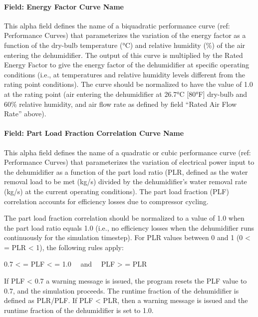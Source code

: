 \paragraph{Field: Energy Factor Curve Name}\label{field-energy-factor-curve-name}

This alpha field defines the name of a biquadratic performance curve (ref: Performance Curves) that parameterizes the variation of the energy factor as a function of the dry-bulb temperature (°\si{C}) and relative humidity (\%) of the air entering the dehumidifier. The output of this curve is multiplied by the Rated Energy Factor to give the energy factor of the dehumidifier at specific operating conditions (i.e., at temperatures and relative humidity levels different from the rating point conditions). The curve should be normalized to have the value of 1.0 at the rating point (air entering the dehumidifier at 26.7°\si{C} {[}80°F{]} dry-bulb and 60\% relative humidity, and air flow rate as defined by field ``Rated Air Flow Rate'' above).

\paragraph{Field: Part Load Fraction Correlation Curve Name}\label{field-part-load-fraction-correlation-curve-name-000}

This alpha field defines the name of a quadratic or cubic performance curve (ref: Performance Curves) that parameterizes the variation of electrical power input to the dehumidifier as a function of the part load ratio (PLR, defined as the water removal load to be met (kg/s) divided by the dehumidifier's water removal rate (kg/s) at the current operating conditions). The part load fraction (PLF) correlation accounts for efficiency losses due to compressor cycling.

The part load fraction correlation should be normalized to a value of 1.0 when the part load ratio equals 1.0 (i.e., no efficiency losses when the dehumidifier runs continuously for the simulation timestep). For PLR values between 0 and 1 (0 \textless{} = PLR \textless{} 1), the following rules apply:

0.7 \textless{} = PLF \textless{} = 1.0~~ and~~ PLF \textgreater{} = PLR

If PLF \textless{} 0.7 a warning message is issued, the program resets the PLF value to 0.7, and the simulation proceeds. The runtime fraction of the dehumidifier is defined as PLR/PLF. If PLF \textless{} PLR, then a warning message is issued and the runtime fraction of the dehumidifier is set to 1.0.

